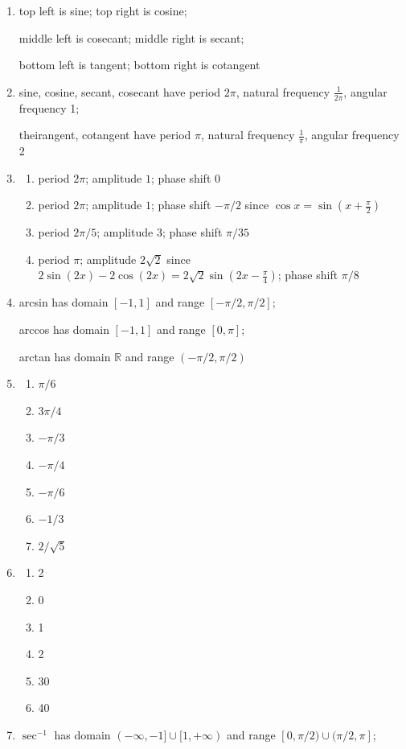 \begin{enumerate}
\item top left is sine; top right is cosine;\par
middle left is cosecant; middle right is secant;\par
bottom left is tangent; bottom right is cotangent
\item sine, cosine, secant, cosecant have period $2\pi$, natural frequency $\frac{1}{2\pi}$, angular frequency 1;\par 
theirangent, cotangent have period $\pi$, natural frequency $\frac{1}{\pi}$, angular frequency 2
\item \begin{enumerate}
\item period $2\pi$; amplitude $1$; phase shift $0$
\item period $2\pi$; amplitude $1$; phase shift $-\pi/2$ since $\cos x = \sin\left(x + \frac{\pi}{2}\right)$
\item period $2\pi/5$; amplitude $3$; phase shift $\pi/35$
\item period $\pi$; amplitude $2\sqrt{2}$ since $2\sin(2x) - 2\cos(2x) = 2\sqrt{2}\sin\left(2x - \frac{\pi}{4}\right)$; phase shift $\pi/8$
\end{enumerate}
\item arcsin has domain $[-1,1]$ and range $[-\pi/2, \pi/2]$;\par
arccos has domain $[-1,1]$ and range $[0,\pi]$;\par
arctan has domain $\mathbb{R}$ and range $(-\pi/2, \pi/2)$
\item \begin{enumerate}
\item $\pi/6$
\item $3\pi/4$
\item $-\pi/3$
\item $-\pi/4$
\item $-\pi/6$
\item $-1/3$
\item $2/\sqrt{5}$
\end{enumerate}
\item \begin{enumerate}
\item 2
\item 0
\item 1
\item 2
\item 30
\item 40
\end{enumerate}
\item $\sec^{-1}$ has domain $(-\infty,-1]\cup [1,+\infty)$ and range $[0,\pi/2)\cup (\pi/2,\pi]$;\par 

\end{enumerate}
